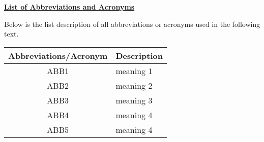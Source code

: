 \begin{center}
\underline{\textbf{List of Abbreviations and Acronyms}}
\end{center}

Below is the list description of all abbreviations or acronyms used in the following text.
\\
\renewcommand{\arraystretch}{1}
\begin{center}
	\begin{tabular}{ c | l }
		Abbreviations/Acronym & Description \\
		\hline\hline
		ABB1 & meaning 1 \\
		ABB2 & meaning 2\\
		ABB3 & meaning 3\\
		ABB4 & meaning 4\\
		ABB5 & meaning 4\\
		\hline\hline
	\end{tabular}
\end{center}